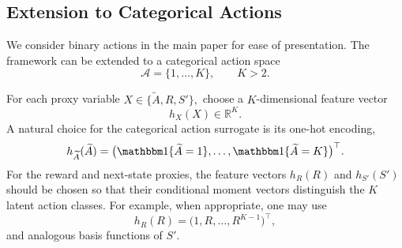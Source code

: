 \documentclass[12pt]{article}
\newcommand{\0}{\boldsymbol{0}}
\begin{document}










\subsection{Extension to Categorical Actions} \label{sec:multi-action}
We consider binary actions in the main paper for ease of presentation. The framework can be extended to a categorical action space
\[
\mathcal A=\{1,\ldots,K\},\qquad K>2.
\]

For each proxy variable \(X\in\{\widetilde A,R,S'\},\) choose a \(K\)-dimensional feature vector
\[
h_X(X)\in\mathbb R^K.
\]
A natural choice for the categorical action surrogate is its one-hot encoding,
\[
h_{\widetilde A}(\widetilde A)=\bigl(\mathbbm 1\{\widetilde A=1\}, \ldots, \mathbbm 1\{\widetilde A=K\}\bigr)^\top.
\]
For the reward and next-state proxies, the feature vectors \(h_R(R)\) and \(h_{S'}(S')\) should be chosen so that their conditional moment vectors distinguish the \(K\) latent action classes. For example, when appropriate, one may use
\[
h_R(R)=\bigl(1,R,\ldots,R^{K-1}\bigr)^\top,
\]
and analogous basis functions of \(S'\).
\end{document}
